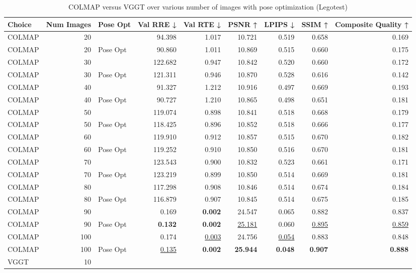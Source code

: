 \begin{table}[H]
\caption{COLMAP versus VGGT over various number of images with pose optimization (Legotest)}
\label{tab:01_num_images_pose_opt_legotest}
\begin{tabular}{lrlrrrrrr}
\toprule
Choice & Num Images & Pose Opt & Val RRE ↓ & Val RTE ↓ & PSNR ↑ & LPIPS ↓ & SSIM ↑ & Composite Quality ↑ \\
\midrule
COLMAP & 20 &  & 94.398 & 1.017 & 10.721 & 0.519 & 0.658 & 0.169 \\
COLMAP & 20 & Pose Opt & 90.860 & 1.011 & 10.869 & 0.515 & 0.660 & 0.175 \\
COLMAP & 30 &  & 122.682 & 0.947 & 10.842 & 0.520 & 0.660 & 0.172 \\
COLMAP & 30 & Pose Opt & 121.311 & 0.946 & 10.870 & 0.528 & 0.616 & 0.142 \\
COLMAP & 40 &  & 91.327 & 1.212 & 10.916 & 0.497 & 0.669 & 0.193 \\
COLMAP & 40 & Pose Opt & 90.727 & 1.210 & 10.865 & 0.498 & 0.651 & 0.181 \\
COLMAP & 50 &  & 119.074 & 0.898 & 10.841 & 0.518 & 0.668 & 0.179 \\
COLMAP & 50 & Pose Opt & 118.425 & 0.896 & 10.852 & 0.518 & 0.666 & 0.177 \\
COLMAP & 60 &  & 119.910 & 0.912 & 10.857 & 0.515 & 0.670 & 0.182 \\
COLMAP & 60 & Pose Opt & 119.252 & 0.910 & 10.850 & 0.516 & 0.670 & 0.181 \\
COLMAP & 70 &  & 123.543 & 0.900 & 10.832 & 0.523 & 0.661 & 0.171 \\
COLMAP & 70 & Pose Opt & 123.219 & 0.899 & 10.850 & 0.514 & 0.669 & 0.181 \\
COLMAP & 80 &  & 117.298 & 0.908 & 10.846 & 0.514 & 0.674 & 0.184 \\
COLMAP & 80 & Pose Opt & 116.879 & 0.907 & 10.845 & 0.514 & 0.675 & 0.185 \\
COLMAP & 90 &  & 0.169 & \textbf{0.002} & 24.547 & 0.065 & 0.882 & 0.837 \\
COLMAP & 90 & Pose Opt & \textbf{0.132} & \textbf{0.002} & \underline{25.181} & 0.060 & \underline{0.895} & \underline{0.859} \\
COLMAP & 100 &  & 0.174 & \underline{0.003} & 24.756 & \underline{0.054} & 0.883 & 0.848 \\
COLMAP & 100 & Pose Opt & \underline{0.135} & \textbf{0.002} & \textbf{25.944} & \textbf{0.048} & \textbf{0.907} & \textbf{0.888} \\
VGGT & 10 &  &  &  &  &  &  &  \\

\end{tabular}
\end{table}
